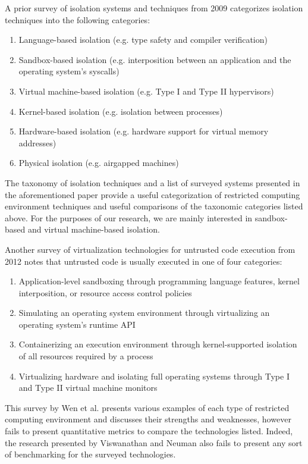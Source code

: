 \documentclass{proc}
\begin{document}
A prior survey of isolation systems and techniques from 2009 \cite{viswanathan2009isolation} categorizes isolation techniques into the following categories:
\begin{enumerate}
    \item Language-based isolation (e.g. type safety and compiler verification)
    \item Sandbox-based isolation (e.g. interposition between an application and the operating system's syscalls)
    \item Virtual machine-based isolation (e.g. Type I and Type II hypervisors)
    \item Kernel-based isolation (e.g. isolation between processes)
    \item Hardware-based isolation (e.g. hardware support for virtual memory addresses)
    \item Physical isolation (e.g. airgapped machines)
\end{enumerate}
The taxonomy of isolation techniques and a list of surveyed systems presented in the aforementioned paper provide a useful categorization of restricted computing environment techniques and useful comparisons of the taxonomic categories listed above. For the purposes of our research, we are mainly interested in sandbox-based and virtual machine-based isolation.

Another survey of virtualization technologies for untrusted code execution from 2012 \cite{wen2012virtualization} notes that untrusted code is usually executed in one of four categories:
\begin{enumerate}
    \item Application-level sandboxing through programming language features, kernel interposition, or resource access control policies
    \item Simulating an operating system environment through virtualizing an operating system's runtime API
    \item Containerizing an execution environment through kernel-supported isolation of all resources required by a process
    \item Virtualizing hardware and isolating full operating systems through Type I and Type II virtual machine monitors
\end{enumerate}
This survey by Wen et al. presents various examples of each type of restricted computing environment and discusses their strengths and weaknesses, however fails to present quantitative metrics to compare the technologies listed. Indeed, the research presented by Viswanathan and Neuman \cite{viswanathan2009isolation} also fails to present any sort of benchmarking for the surveyed technologies.
\end{document}
